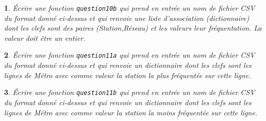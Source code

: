 \documentclass[10pt]{article}
\newtheorem{exi}{}
\newenvironment{exo}{\begin{exi}\em}{\end{exi}}
\begin{document}
\vspace*{-2ex}
\begin{exo}
    Écrire une fonction {\tt question10b} qui prend en entrée un nom de fichier CSV
du format donné ci-dessus
et qui renvoie une liste d'association (dictionnaire) dont les clefs sont
des paires (Station,Réseau) et les valeurs leur fréquentation.
La valeur doit être un entier.
\end{exo}
\vspace*{-2ex}
\begin{exo}
    Écrire une fonction {\tt question11a} qui prend en entrée un nom de fichier CSV
du format donné ci-dessus et qui renvoie un dictionnaire dont les clefs sont
les lignes de Métro
avec comme valeur la station la plus fréquentée sur cette ligne.
\end{exo}
\vspace*{-2ex}
\begin{exo}
    Écrire une fonction {\tt question11b} qui prend en entrée un nom de fichier CSV
du format donné ci-dessus et qui renvoie un dictionnaire dont les clefs sont
les lignes de Métro
avec comme valeur la station la moins fréquentée sur cette ligne.
\end{exo}
\vspace*{-2ex}
\end{document}
